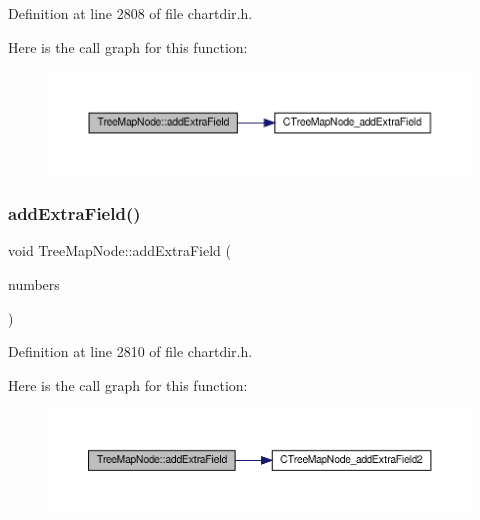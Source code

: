 Definition at line 2808 of file chartdir.\+h.

Here is the call graph for this function\+:
\nopagebreak
\begin{figure}[H]
\begin{center}
\leavevmode
\includegraphics[width=350pt]{class_tree_map_node_a865359bf017ab7cf88a8262eb874b042_cgraph}
\end{center}
\end{figure}
\mbox{\label{class_tree_map_node_a6ab6da145b81186f5ac8c756e100ec3b}} 
\subsubsection{\texorpdfstring{add\+Extra\+Field()}{addExtraField()}\hspace{0.1cm}{\footnotesize\ttfamily [2/2]}}
{\footnotesize\ttfamily void Tree\+Map\+Node\+::add\+Extra\+Field (\begin{DoxyParamCaption}\item[{\hyperlink{class_double_array}{Double\+Array}}]{numbers }\end{DoxyParamCaption})\hspace{0.3cm}{\ttfamily [inline]}}



Definition at line 2810 of file chartdir.\+h.

Here is the call graph for this function\+:
\nopagebreak
\begin{figure}[H]
\begin{center}
\leavevmode
\includegraphics[width=350pt]{class_tree_map_node_a6ab6da145b81186f5ac8c756e100ec3b_cgraph}
\end{center}
\end{figure}
\mbox{\label{class_tree_map_node_ae8e084cd21a03ecc16b8c70601424f19}} 
